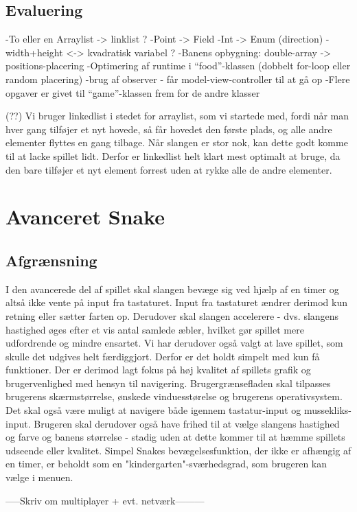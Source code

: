 \documentclass{report}
\begin{document}
\section{Evaluering}
-To eller en Arraylist -> linklist ?
-Point -> Field
-Int -> Enum (direction)
-width+height <-> kvadratisk variabel ?
-Banens opbygning: double-array -> positions-placering
-Optimering af runtime i “food”-klassen (dobbelt for-loop eller random placering)
-brug af observer - får model-view-controller til at gå op
-Flere opgaver er givet til “game”-klassen frem for de andre klasser

(??) Vi bruger linkedlist i stedet for arraylist, som vi startede med, fordi når man hver gang tilføjer et nyt hovede, så får hovedet den første plads, og alle andre elementer flyttes en gang tilbage. Når slangen er stor nok, kan dette godt komme til at lacke spillet lidt. Derfor er linkedlist helt klart mest optimalt at bruge, da den bare tilføjer et nyt element forrest uden at rykke alle de andre elementer.

\chapter{Avanceret Snake}
\section{Afgrænsning}
I den avancerede del af spillet skal slangen bevæge sig ved hjælp af en timer og altså ikke vente på input fra tastaturet. Input fra tastaturet ændrer derimod kun retning eller sætter farten op. Derudover skal slangen accelerere - dvs. slangens hastighed øges efter et vis antal samlede æbler, hvilket gør spillet mere udfordrende og mindre ensartet. Vi har derudover også valgt at lave spillet, som skulle det udgives helt færdiggjort. Derfor er det holdt simpelt med kun få funktioner. Der er derimod lagt fokus på høj kvalitet af spillets grafik og brugervenlighed med hensyn til navigering. Brugergrænsefladen skal tilpasses brugerens skærmstørrelse, ønskede vinduesstørelse og brugerens operativsystem. Det skal også være muligt at navigere både igennem tastatur-input og mussekliks-input. Brugeren skal derudover også have frihed til at vælge slangens hastighed og farve og banens størrelse - stadig uden at dette kommer til at hæmme spillets udseende eller kvalitet. Simpel Snakes bevægelsesfunktion, der ikke er afhængig af en timer, er beholdt som en "kindergarten"-sværhedsgrad, som brugeren kan vælge i menuen.

-----Skriv om multiplayer + evt. netværk---------
\end{document}
